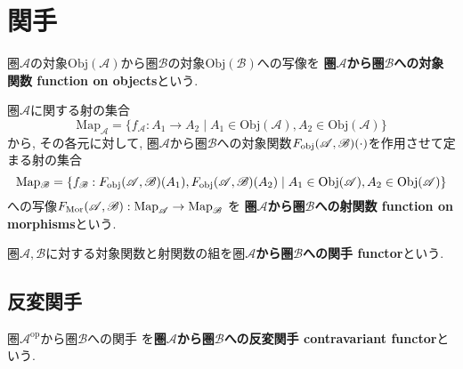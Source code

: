 \section{関手}
\begin{Def}
圏$\mathscr{A}$の対象$\mathrm{Obj}(\mathscr{A})$から圏$\mathscr{B}$の対象$\mathrm{Obj}(\mathscr{B})$への写像を
{\bf 圏$\mathscr{A}$から圏$\mathscr{B}$への対象関数 function on objects}という.
\end{Def}
\begin{Def}
圏$\mathscr{A}$に関する射の集合\[\mathrm{Map}_{\mathscr{A}}=\{f_{\mathscr{A}}:A_1\rightarrow A_2\mid A_1\in\mathrm{Obj}(\mathscr{A}),A_2\in\mathrm{Obj}(\mathscr{A})\}\]
から, その各元に対して, 
圏$\mathscr{A}$から圏$\mathscr{B}$への対象関数$F_{\rm obj}(\mathscr{A},\mathscr{B})(\cdot)$を作用させて定まる射の集合
\[
\mathrm{Map_\mathscr{B}}=\{f_{\mathscr{B}}:F_{\rm obj}(\mathscr{A},\mathscr{B})(A_1),
F_{\rm obj}(\mathscr{A},\mathscr{B})(A_2)\mid A_1\in\mathrm{Obj}(\mathscr{A}),A_2\in\mathrm{Obj}(\mathscr{A})\}
\]
への写像$F_{\rm Mor}(\mathscr{A},\mathscr{B}):\mathrm{Map}_{\mathscr{A}}\rightarrow\mathrm{Map}_{\mathscr{B}}$
を
{\bf 圏$\mathscr{A}$から圏$\mathscr{B}$への射関数 function on morphisms}という.
\end{Def}
\begin{Def}
圏$\mathscr{A},\mathscr{B}$に対する対象関数と射関数の組を{\bf $圏\mathscr{A}$から圏$\mathscr{B}$への関手 functor}という.
\end{Def}
\begin{comment}
\begin{example}
順序を保存する写像
\end{example}
\end{comment}
\begin{comment}
\begin{example}
圏と見做した順序集合間の簡単な関手の例
\end{example}
\end{comment}
\begin{comment}
*************************
\begin{example}
$n$次ホモロジー関手
\end{example}
***************************
\end{comment}

\subsection{反変関手}
\begin{Def}
圏$\mathscr{A}^{\mathrm{op}}$から圏$\mathscr{B}$への関手
を{\bf 圏$\mathscr{A}$から圏$\mathscr{B}$への反変関手 contravariant functor}という.
\end{Def}
